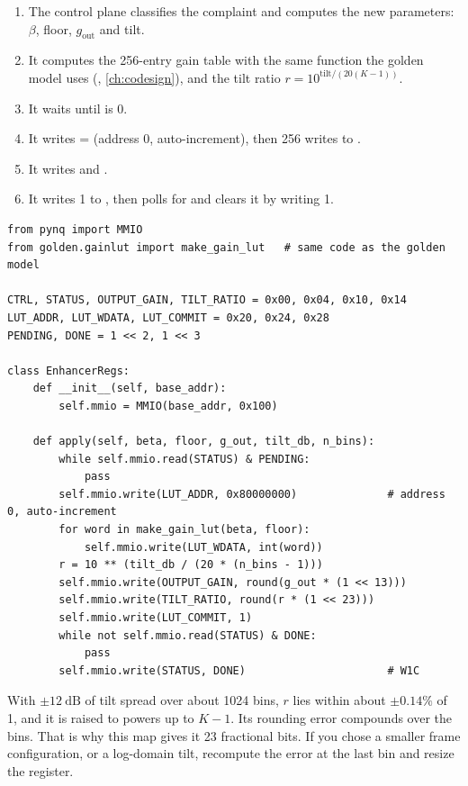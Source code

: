 \begin{enumerate}
  \item The control plane classifies the complaint and computes the new
        parameters: $\beta$, floor, $g_\text{out}$ and tilt.
  \item It computes the 256-entry gain table with the same function the golden
        model uses (, \cref{ch:codesign}), and the tilt
        ratio $r=10^{\text{tilt}/(20(K-1))}$.
  \item It waits until  is 0.
  \item It writes  =  (address 0,
        auto-increment), then 256 writes to .
  \item It writes  and .
  \item It writes 1 to , then polls for
         and clears it by writing 1.
\end{enumerate}

\begin{lstlisting}[style=py,caption={A sketch of the Python driver on the PYNQ (check the MMIO API of your PYNQ version).}]
from pynq import MMIO
from golden.gainlut import make_gain_lut   # same code as the golden model

CTRL, STATUS, OUTPUT_GAIN, TILT_RATIO = 0x00, 0x04, 0x10, 0x14
LUT_ADDR, LUT_WDATA, LUT_COMMIT = 0x20, 0x24, 0x28
PENDING, DONE = 1 << 2, 1 << 3

class EnhancerRegs:
    def __init__(self, base_addr):
        self.mmio = MMIO(base_addr, 0x100)

    def apply(self, beta, floor, g_out, tilt_db, n_bins):
        while self.mmio.read(STATUS) & PENDING:
            pass
        self.mmio.write(LUT_ADDR, 0x80000000)              # address 0, auto-increment
        for word in make_gain_lut(beta, floor):
            self.mmio.write(LUT_WDATA, int(word))
        r = 10 ** (tilt_db / (20 * (n_bins - 1)))
        self.mmio.write(OUTPUT_GAIN, round(g_out * (1 << 13)))
        self.mmio.write(TILT_RATIO, round(r * (1 << 23)))
        self.mmio.write(LUT_COMMIT, 1)
        while not self.mmio.read(STATUS) & DONE:
            pass
        self.mmio.write(STATUS, DONE)                      # W1C
\end{lstlisting}

\begin{tipbox}
With $\pm\qty{12}{\dB}$ of tilt spread over about 1024 bins, $r$ lies within
about $\pm0.14\%$ of 1, and it is raised to powers up to $K-1$. Its rounding
error compounds over the bins. That is why this map gives it 23 fractional bits.
If you chose a smaller frame configuration, or a log-domain tilt, recompute the
error at the last bin and resize the register.
\end{tipbox}
